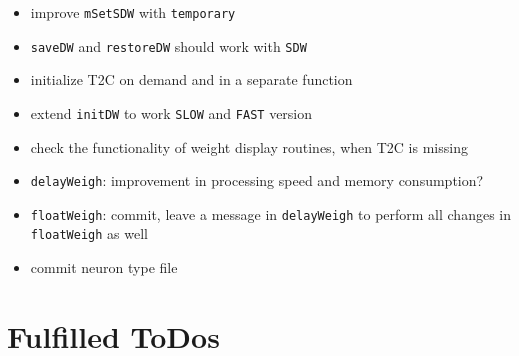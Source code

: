 \documentclass[12pt]{article}
\begin{document}
\begin{itemize}
\item improve \texttt{mSetSDW} with \texttt{temporary}
\item \texttt{saveDW} and \texttt{restoreDW} should work with \texttt{SDW}
\item initialize T2C on demand and in a separate function
\item extend \texttt{initDW} to work \texttt{SLOW} and \texttt{FAST} version
\item check the functionality of weight display routines, when T2C is missing
\item \texttt{delayWeigh}: improvement in processing speed and memory consumption?
\item \texttt{floatWeigh}: commit, leave a message in \texttt{delayWeigh} to perform all changes in \texttt{floatWeigh} as well
\item commit neuron type file
\end{itemize}



\section{Fulfilled ToDos}
\end{document}
